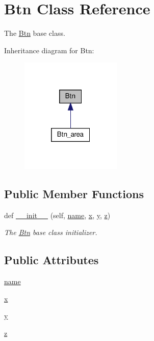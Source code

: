 \hypertarget{classRET__config_1_1Btn}{}\section{Btn Class Reference}
\label{classRET__config_1_1Btn}


The \hyperlink{classRET__config_1_1Btn}{Btn} base class.  




Inheritance diagram for Btn\+:
\nopagebreak
\begin{figure}[H]
\begin{center}
\leavevmode
\includegraphics[width=136pt]{classRET__config_1_1Btn__inherit__graph}
\end{center}
\end{figure}
\subsection*{Public Member Functions}
\begin{DoxyCompactItemize}
\item 
def \hyperlink{classRET__config_1_1Btn_ab98adcd48a87d3624f5913a189a7b329}{\+\_\+\+\_\+init\+\_\+\+\_\+} (self, \hyperlink{classRET__config_1_1Btn_ab74e6bf80237ddc4109968cedc58c151}{name}, \hyperlink{classRET__config_1_1Btn_a9336ebf25087d91c818ee6e9ec29f8c1}{x}, \hyperlink{classRET__config_1_1Btn_a2fb1c5cf58867b5bbc9a1b145a86f3a0}{y}, \hyperlink{classRET__config_1_1Btn_a25ed1bcb423b0b7200f485fc5ff71c8e}{z})
\begin{DoxyCompactList}\small\item\em The \hyperlink{classRET__config_1_1Btn}{Btn} base class initializer. \end{DoxyCompactList}\end{DoxyCompactItemize}
\subsection*{Public Attributes}
\begin{DoxyCompactItemize}
\item 
\hyperlink{classRET__config_1_1Btn_ab74e6bf80237ddc4109968cedc58c151}{name}
\item 
\hyperlink{classRET__config_1_1Btn_a9336ebf25087d91c818ee6e9ec29f8c1}{x}
\item 
\hyperlink{classRET__config_1_1Btn_a2fb1c5cf58867b5bbc9a1b145a86f3a0}{y}
\item 
\hyperlink{classRET__config_1_1Btn_a25ed1bcb423b0b7200f485fc5ff71c8e}{z}
\end{DoxyCompactItemize}


